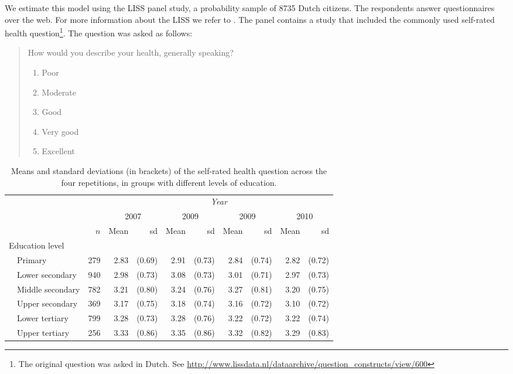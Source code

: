 \documentclass[a4paper,11pt]{article}
\newcommand{\0}{\boldsymbol{0}}
\begin{document}
We estimate this model using the LISS panel study, a probability sample 
of 8735 Dutch citizens. The respondents answer questionnaires over the web. For more information about the LISS we refer to \cite{scherpenzeel2011data}.
The  panel contains a study that included the commonly used self-rated health question\footnote{The original question was asked in Dutch. See \url{http://www.lissdata.nl/dataarchive/question_constructs/view/600}}. The question was asked as follows:
\begin{quote}
	How would you describe your health, generally speaking?
	
	\begin{enumerate}  \setlength{\itemsep}{0pt}  \setlength{\parskip}{0pt}
  \setlength{\parsep}{0pt}
		\item Poor
		\item Moderate
		\item Good
		\item Very good
		\item Excellent
	\end{enumerate}
\end{quote}


\begin{table}[bt]\begin{small}
\begin{center}
\begin{tabular}{llrrrrrrrrr}  \hline  \hline
&&&  \multicolumn{8}{c}{\emph{Year}}\\\cline{4-11}
&&& \multicolumn{2}{c}{2007} & \multicolumn{2}{c}{2009} & \multicolumn{2}{c}{2009} & \multicolumn{2}{c}{2010} \\
&&$n$&Mean&sd&Mean&sd&Mean&sd&Mean&sd\\
  \hline
  \multicolumn{2}{l}{Education level}\\
 
& Primary	  & 279 & 2.83 & (0.69) & 2.91 & (0.73) & 2.84 & (0.74) & 2.82 & (0.72) \\ 
& Lower secondary  & 940 & 2.98 & (0.73) & 3.08 & (0.73) & 3.01 & (0.71) & 2.97 & (0.73) \\ 
& Middle secondary & 782 & 3.21 & (0.80) & 3.24 & (0.76) & 3.27 & (0.81) & 3.20 & (0.75) \\ 
& Upper secondary  & 369 & 3.17 & (0.75) & 3.18 & (0.74) & 3.16 & (0.72) & 3.10 & (0.72) \\ 
& Lower tertiary	  & 799 & 3.28 & (0.73) & 3.28 & (0.76) & 3.22 & (0.72) & 3.22 & (0.74) \\ 
& Upper tertiary	  & 256 & 3.33 & (0.86) & 3.35 & (0.86) & 3.32 & (0.82) & 3.29 & (0.83) \\ 
   \hline
   \hline
\end{tabular}
\caption{Means and standard deviations (in brackets) of the self-rated health question across the four repetitions, in 
groups with different levels of education.}\label{tab:descriptives}
\end{center}\end{small}
\end{table}
\end{document}
